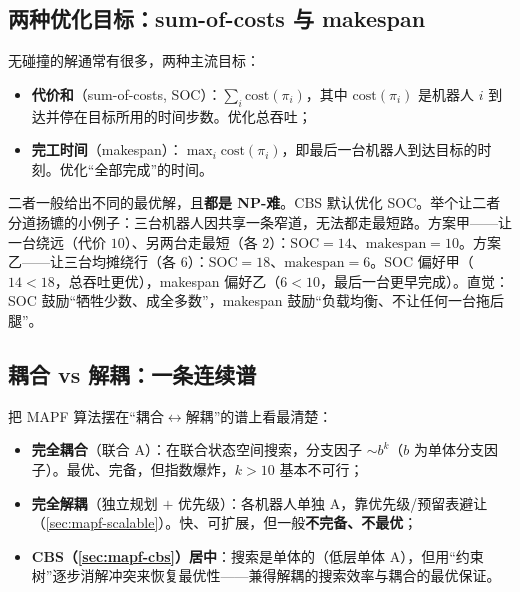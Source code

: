 \subsection{两种优化目标：sum-of-costs 与 makespan}
\label{sec:mapf-objectives}

\begin{definition}\label{def:mapf-objectives}
无碰撞的解通常有很多，两种主流目标：
\begin{itemize}
  \item \textbf{代价和}（sum-of-costs, SOC）：$\sum_{i} \mathrm{cost}(\pi_i)$，其中 $\mathrm{cost}(\pi_i)$ 是机器人 $i$ 到达并停在目标所用的时间步数。优化总吞吐；
  \item \textbf{完工时间}（makespan）：$\max_i \mathrm{cost}(\pi_i)$，即最后一台机器人到达目标的时刻。优化“全部完成”的时间。
\end{itemize}
\end{definition}

二者一般给出不同的最优解，且\textbf{都是 NP-难}\cite{yu2013structure}。CBS 默认优化 SOC。举个让二者分道扬镳的小例子：三台机器人因共享一条窄道，无法都走最短路。方案甲——让一台绕远（代价 $10$）、另两台走最短（各 $2$）：$\mathrm{SOC}=14$、$\mathrm{makespan}=10$。方案乙——让三台均摊绕行（各 $6$）：$\mathrm{SOC}=18$、$\mathrm{makespan}=6$。SOC 偏好甲（$14<18$，总吞吐更优），makespan 偏好乙（$6<10$，最后一台更早完成）。直觉：SOC 鼓励“牺牲少数、成全多数”，makespan 鼓励“负载均衡、不让任何一台拖后腿”。

\subsection{耦合 vs 解耦：一条连续谱}
\label{sec:mapf-spectrum}

把 MAPF 算法摆在“耦合$\leftrightarrow$解耦”的谱上看最清楚：

\begin{itemize}
  \item \textbf{完全耦合}（联合 A\*）：在联合状态空间搜索，分支因子 $\sim b^k$（$b$ 为单体分支因子）。最优、完备，但指数爆炸，$k>10$ 基本不可行；
  \item \textbf{完全解耦}（独立规划 $+$ 优先级）：各机器人单独 A\*，靠优先级/预留表避让（\cref{sec:mapf-scalable}）。快、可扩展，但一般\textbf{不完备、不最优}；
  \item \textbf{CBS（\cref{sec:mapf-cbs}）居中}：搜索是单体的（低层单体 A\*），但用“约束树”逐步消解冲突来恢复最优性——兼得解耦的搜索效率与耦合的最优保证。
\end{itemize}

